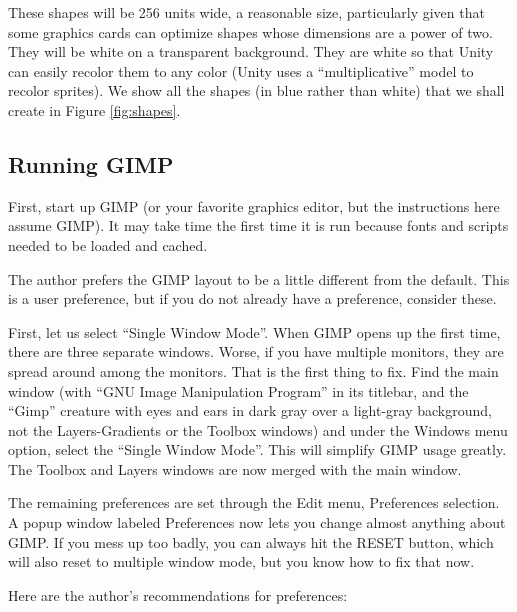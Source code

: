 \documentclass[12pt]{amsbook}
\theoremstyle{definition}
\theoremstyle{remark}
\numberwithin{figure}{chapter}
\numberwithin{table}{chapter}
\numberwithin{section}{chapter}
\numberwithin{equation}{section}
\begin{document}
These shapes will be 256 units wide, a reasonable size, particularly given that some graphics cards can optimize shapes whose dimensions are a power of two.  They will be white on a transparent background.  They are white so that Unity can easily recolor them to any color (Unity uses a ``multiplicative'' model to recolor sprites).  We show all the shapes (in blue rather than white) that we shall create in Figure \ref{fig:shapes}.


\subsection{Running GIMP}
First, start up GIMP (or your favorite graphics editor, but the instructions here assume GIMP).  It may take time the first time it is run because fonts and scripts needed to be loaded and cached.

The author prefers the GIMP layout to be a little different from the default.  This is a user preference, but if you do not already have a preference, consider these.

First, let us select ``Single Window Mode''.  When GIMP opens up the first time, there are three separate windows.  Worse, if you have multiple monitors, they are spread around among the monitors.  That is the first thing to fix.  Find the main window (with ``GNU Image Manipulation Program'' in its titlebar, and the ``Gimp'' creature with eyes and ears in dark gray over a light-gray background, not the Layers-Gradients or the Toolbox windows) and under the Windows menu option, select the ``Single Window Mode''.  This will simplify GIMP usage greatly.  The Toolbox and Layers windows are now merged with the main window.

The remaining preferences are set through the Edit menu, Preferences selection.  A popup window labeled Preferences now lets you change almost anything about GIMP.  If you mess up too badly, you can always hit the RESET button, which will also reset to multiple window mode, but you know how to fix that now.

Here are the author's recommendations for preferences:
\end{document}
